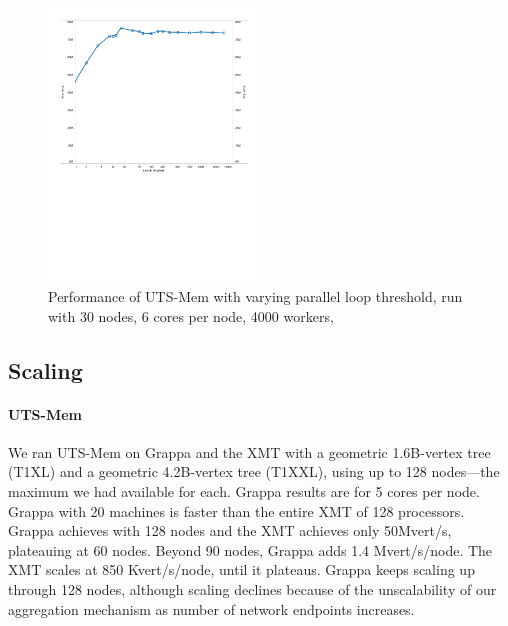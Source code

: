 \begin{figure}[ht]
    \begin{center}
      \includegraphics[width=0.5\textwidth]{figs/uts_threshold.pdf}
    \end{center}
    \caption{Performance of UTS-Mem with varying parallel loop
        threshold, run with 30 nodes, 6 cores per node, 4000 workers,
    }
    \label{fig:uts_threshold}
\end{figure}

\subsection{Scaling}
\paragraph{UTS-Mem}
We ran UTS-Mem on Grappa and the XMT with a geometric 1.6B-vertex tree
(T1XL) and a geometric 4.2B-vertex tree (T1XXL), using up to 128
nodes---the maximum we had available for each. Grappa results are for 5 cores per node. Grappa with 20 machines is faster than the entire XMT of 128 processors.
Grappa achieves  with 128 nodes and the XMT
achieves only 50Mvert/s, plateauing at 60 nodes. Beyond 90 nodes, Grappa adds 1.4 Mvert/s/node.
The XMT scales at 850 Kvert/s/node, until it plateaus. Grappa keeps
scaling up through 128 nodes, although scaling
declines because of the unscalability of our aggregation mechanism as
number of network endpoints increases. 

